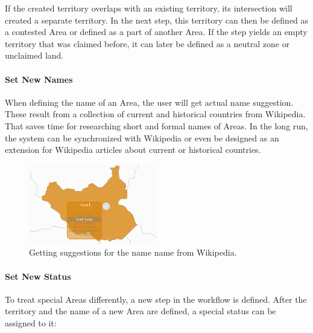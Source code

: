 If the created territory overlaps with an existing territory, its intersection will created a separate territory. In the next step, this territory can then be defined as a contested Area or defined as a part of another Area. If the step yields an empty territory that was claimed before, it can later be defined as a neutral zone or unclaimed land.


\paragraph{Set New Names} %
\label{par:set_new_name}

When defining the name of an Area, the user will get actual name suggestion. These result from a collection of current and historical countries from Wikipedia. That saves time for researching short and formal names of Areas. In the long run, the system can be synchronized with Wikipedia or even be designed as an extension for Wikipedia articles about current or historical countries.

\begin{figure}[H]
  \centering
  \includegraphics[width=0.5\textwidth]{graphics/extensions/new_name_tool}
  \caption{Getting suggestions for the name name from Wikipedia.}
  \label{fig:uncertainty_new_name_tool}
\end{figure}


\paragraph{Set New Status} %
\label{par:set_new_status}

To treat special Areas differently, a new step in the workflow is defined. After the territory and the name of a new Area are defined, a special status can be assigned to it:

